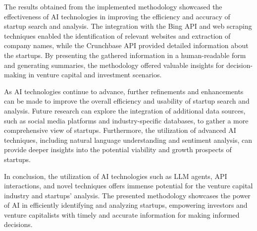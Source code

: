 \documentclass[a4paper,11pt]{article}
\begin{document}
The results obtained from the implemented methodology showcased the effectiveness of AI technologies in improving the efficiency and accuracy of startup search and analysis. The integration with the Bing API and web scraping techniques enabled the identification of relevant websites and extraction of company names, while the Crunchbase API provided detailed information about the startups. By presenting the gathered information in a human-readable form and generating summaries, the methodology offered valuable insights for decision-making in venture capital and investment scenarios.

As AI technologies continue to advance, further refinements and enhancements can be made to improve the overall efficiency and usability of startup search and analysis. Future research can explore the integration of additional data sources, such as social media platforms and industry-specific databases, to gather a more comprehensive view of startups. Furthermore, the utilization of advanced AI techniques, including natural language understanding and sentiment analysis, can provide deeper insights into the potential viability and growth prospects of startups.

In conclusion, the utilization of AI technologies such as LLM agents, API interactions, and novel techniques offers immense potential for the venture capital industry and startups' analysis. The presented methodology showcases the power of AI in efficiently identifying and analyzing startups, empowering investors and venture capitalists with timely and accurate information for making informed decisions.
\end{document}
